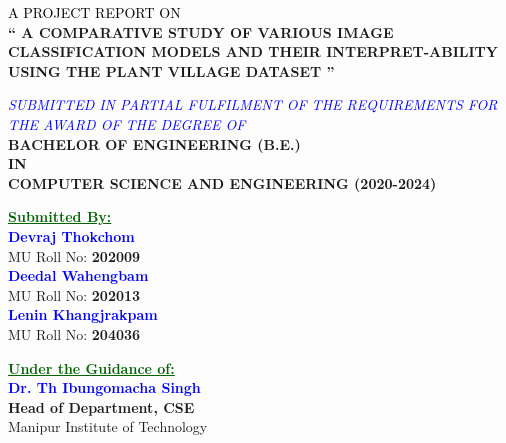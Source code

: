 \documentclass[12pt, oneside, a4paper]{book}
\begin{document}
\begingroup
    \centering
    \large \textcolor{black}{A PROJECT REPORT ON}\\
    \Large \color{DarkGreen}\textbf{`` A COMPARATIVE STUDY OF VARIOUS IMAGE CLASSIFICATION MODELS AND THEIR INTERPRET-ABILITY USING THE PLANT VILLAGE DATASET ''}
    \color{black}
    \par\vspace{1em}
    
    \textcolor{Blue}{\normalsize \textit{SUBMITTED IN PARTIAL FULFILMENT OF THE REQUIREMENTS FOR THE AWARD OF THE DEGREE OF}} \\[1em]
    \color{red}\large\textbf{BACHELOR OF ENGINEERING (B.E.)} \\
    \color{red}\large\textbf{IN} \\
    \color{red}\large\textbf{COMPUTER SCIENCE AND ENGINEERING (2020-2024)}\\ [2em]
\endgroup

\begingroup
    \begin{center}
        \large \textcolor{DarkGreen}{\underline{\textbf{Submitted By:}}}\\
        \large \textcolor{Blue}{\textbf{Devraj Thokchom}}\\
        \normalsize MU Roll No: \textbf{202009}\\
        \large \textcolor{Blue}{\textbf{Deedal Wahengbam}}\\
        \normalsize MU Roll No: \textbf{202013}\\
        \large \textcolor{Blue}{\textbf{Lenin Khangjrakpam}}\\
        \normalsize MU Roll No: \textbf{204036}\\ [2em]
    \end{center}
    
    \begin{center}
        \large \textcolor{DarkGreen}{\underline{\textbf{Under the Guidance of:}}}\\
        \large \textcolor{Blue}{\textbf{Dr. Th Ibungomacha Singh}}\\
        \normalsize \textbf{Head of Department, CSE}\\
        \normalsize Manipur Institute of Technology\\ [1em]
    \end{center}
\endgroup
\end{document}
